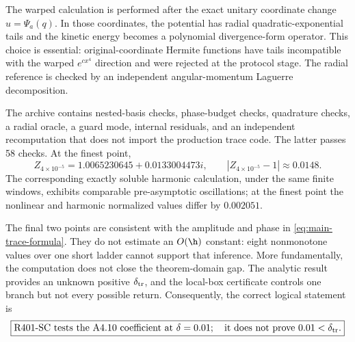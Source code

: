 The warped calculation is performed after the exact unitary coordinate
change \(u=\Psi_a(q)\).  In those coordinates, the potential has radial
quadratic-exponential tails and the kinetic energy becomes a polynomial
divergence-form operator.  This choice is essential: original-coordinate
Hermite functions have tails incompatible with the warped
\(e^{c x^4}\) direction and were rejected at the protocol stage.  The radial
reference is checked by an independent angular-momentum Laguerre
decomposition.

The archive contains nested-basis checks, phase-budget checks, quadrature
checks, a radial oracle, a guard mode, internal residuals, and an independent
recomputation that does not import the production trace code.  The latter
passes 58 checks.  At the finest point,
\begin{equation}
 Z_{4\times10^{-5}}
 =1.0065230645+0.0133004473i,
 \qquad
 |Z_{4\times10^{-5}}-1|\approx0.0148.
 \label{eq:finest-z}
\end{equation}
The corresponding exactly soluble harmonic calculation, under the same
finite windows, exhibits comparable pre-asymptotic oscillations; at the
finest point the nonlinear and harmonic normalized values differ by
\(0.002051\).

The final two points are consistent with the amplitude and phase in
\cref{eq:main-trace-formula}.  They do not estimate an \(O(\h)\) constant:
eight nonmonotone values over one short ladder cannot support that inference.
More fundamentally, the computation does not close the theorem-domain gap.
The analytic result provides an unknown positive \(\delta_{\rm tr}\), and
the local-box certificate controls one branch but not every possible return.
Consequently, the correct logical statement is
\begin{equation}
 \boxed{\text{R401-SC tests the A4.10 coefficient at }\delta=0.01;
 \quad \text{it does not prove }0.01<\delta_{\rm tr}.}
 \label{eq:diagnostic-boundary}
\end{equation}
